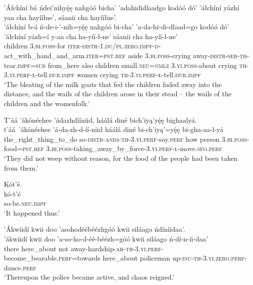 \ea\label{ex:text7-2-3}
’Áłchíní bá ńdei’nihyę́ę nahgóó bicha’ ’adahididlaadgo kodóó dó’ ’áłchíní yázhí yaa cha hayííłne’, sáanii cha hayííłne’.\\
\gll ’áłchíní	b-á	ń-de-i-’-nih=yę́ę	nahgóó	bi-cha’	’a-da-hi-di-dlaad=go	kodóó	dó’	’áłchíní	yázh=í	y-aa	cha	ha-yíí-ł-ne’	sáanii	cha	ha-yíí-ł-ne’\\
     children	3.\textsc{bi}.\textsc{poss}-for	\textsc{iter}-\textsc{distr}-1.\textsc{du}/\textsc{pl}.\textsc{zero}.\textsc{impf}-\textsc{d}-act\_with\_hand\_and\_arm.\textsc{iter}=\textsc{pst}.\textsc{ref}	aside	3.\textsc{bi}.\textsc{poss}-crying	away-\textsc{distr}-\textsc{ser}-\textsc{th}-tear.\textsc{impf}=\textsc{sub}	from\_here	also	children	small.\textsc{neu}=\textsc{nmlz}	3.\textsc{yi}.\textsc{poss}-about	crying	\textsc{th}-3.\textsc{yi}.\textsc{perf}-\textsc{ł}-tell.\textsc{dur}.\textsc{impf}	women	crying	\textsc{th}-3.\textsc{yi}.\textsc{perf}-\textsc{ł}-tell.\textsc{dur}.\textsc{impf}\\
\glt `The bleating of the milk goats that fed the children faded away into the distance, and the wails of the children arose in their stead -- the wails of the children and the womenfolk.'
\z

\ea\label{ex:text7-2-4}
T’áá ’ákónéehee ’ádazhdííniid, háálá diné bich’iyą’yę́ę bighaalyá.\\
\gll t’áá~{’ákónéehee}	’á-da-zh-d-íí-niid	háálá	diné	bi-ch’iyą’=yę́ę	bi-gha-aa-l-yá\\
     the\_right\_thing\_to\_do	so-\textsc{distr}-\textsc{anim}-\textsc{th}-3.\textsc{yi}.\textsc{perf}-say.\textsc{perf}	how	person	3.\textsc{bi}.\textsc{poss}-food=\textsc{pst}.\textsc{ref}	3.\textsc{bi}.\textsc{poss}-taking\_away\_by\_force-3.\textsc{yi}.\textsc{perf}-\textsc{l}-move.\textsc{sfo}.\textsc{perf}\\
\glt `They did not weep without reason, for the food of the people had been taken from them.'
\z

\ea\label{ex:text7-2-5}
Kót’é.\\
\gll kó-t’é\\
     so-be.\textsc{neu}.\textsc{impf}\\
\glt `It happened thus.'
\z

\ea\label{ex:text7-2-6}
’Ákwiidí kwii doo ’asohodéébéézhgóó kwii siláago ńdíníidaa’.\\
\gll ’ákwiidí	kwii	doo	’a-so-ho-d-éé-béézh=góó	kwii	siláago	ń-dí-n-íi-daa’\\
     there	here\_about	not	away-hardship-\textsc{ar}-\textsc{th}-3.\textsc{yi}.\textsc{perf}-become\_bearable.\textsc{perf}=towards	here\_about	policeman	up-\textsc{inc}-\textsc{th}-3.\textsc{yi}.\textsc{zero}.\textsc{perf}-dance.\textsc{perf}\\
\glt `Thereupon the police became active, and chaos reigned.'
\z


